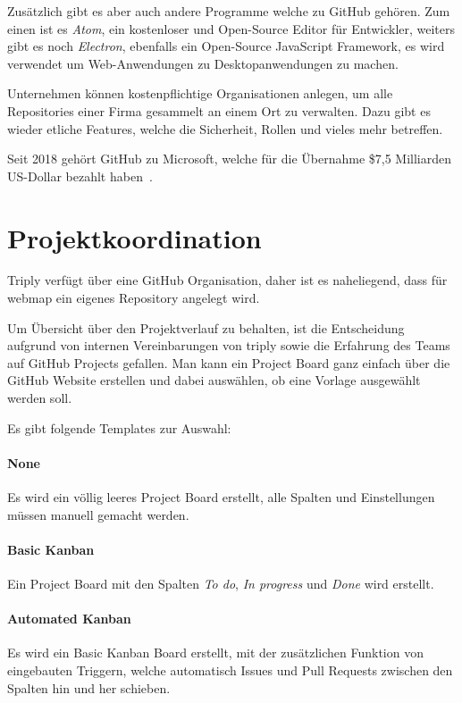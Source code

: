 Zusätzlich gibt es aber auch andere Programme welche zu GitHub gehören.
Zum einen ist es \emph{Atom}, ein kostenloser und Open-Source Editor für Entwickler, weiters gibt es noch \emph{Electron},
ebenfalls ein Open-Source JavaScript Framework, es wird verwendet um Web-Anwendungen zu Desktopanwendungen zu machen.

Unternehmen können kostenpflichtige Organisationen anlegen, um alle Repositories einer Firma gesammelt an einem Ort zu verwalten.
Dazu gibt es wieder etliche Features, welche die Sicherheit, Rollen und vieles mehr betreffen.

Seit 2018 gehört GitHub zu Microsoft, welche für die Übernahme \$7,5 Milliarden US-Dollar bezahlt haben~\cite{microsoft-acquires-github}.


\section{Projektkoordination}
Triply verfügt über eine GitHub Organisation, daher ist es naheliegend, dass für webmap ein eigenes Repository angelegt wird.

Um Übersicht über den Projektverlauf zu behalten, ist die Entscheidung aufgrund von internen Vereinbarungen von triply sowie die
Erfahrung des Teams auf GitHub Projects gefallen.
Man kann ein Project Board ganz einfach über die GitHub Website erstellen und dabei auswählen, ob eine Vorlage ausgewählt werden soll.

Es gibt folgende Templates zur Auswahl: ~\cite{github-create-project}

\paragraph{None}
Es wird ein völlig leeres Project Board erstellt, alle Spalten und Einstellungen müssen manuell gemacht werden.

\paragraph{Basic Kanban}
Ein Project Board mit den Spalten \emph{To do}, \emph{In progress} und \emph{Done} wird erstellt.

\paragraph{Automated Kanban}
Es wird ein Basic Kanban Board erstellt, mit der zusätzlichen Funktion von eingebauten Triggern, welche automatisch Issues
und Pull Requests zwischen den Spalten hin und her schieben.

